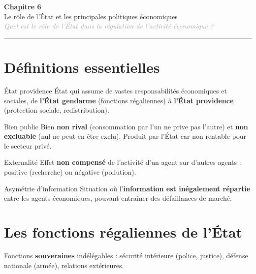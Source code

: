 \documentclass[11pt,a4paper]{article}
\begin{document}
\begin{center}
  {\Large\bfseries\textcolor{mainColor}{Chapitre 6}}\\[2pt]
  {\large Le rôle de l'État et les principales politiques économiques}\\[4pt]
  \textit{\textcolor{darkGray}{Quel est le rôle de l'État dans la régulation de l'activité économique ?}}
\end{center}
\vspace{4pt}\hrule\vspace{8pt}

\section*{Définitions essentielles}

\begin{defbox}{État providence}
État qui assume de vastes responsabilités économiques et sociales, de \textbf{l'État gendarme} (fonctions régaliennes) à \textbf{l'État providence} (protection sociale, redistribution).
\end{defbox}

\vspace{4pt}
\begin{defbox}{Bien public}
Bien \textbf{non rival} (consommation par l'un ne prive pas l'autre) et \textbf{non excluable} (nul ne peut en être exclu). Produit par l'État car non rentable pour le secteur privé.
\end{defbox}

\vspace{4pt}
\begin{defbox}{Externalité}
Effet \textbf{non compensé} de l'activité d'un agent sur d'autres agents : positive (recherche) ou négative (pollution).
\end{defbox}

\vspace{4pt}
\begin{defbox}{Asymétrie d'information}
Situation où l'\textbf{information est inégalement répartie} entre les agents économiques, pouvant entraîner des défaillances de marché.
\end{defbox}

\section*{Les fonctions régaliennes de l'État}

\begin{keybox}
Fonctions \textbf{souveraines} indélégables : sécurité intérieure (police, justice), défense nationale (armée), relations extérieures.
\end{keybox}
\end{document}
